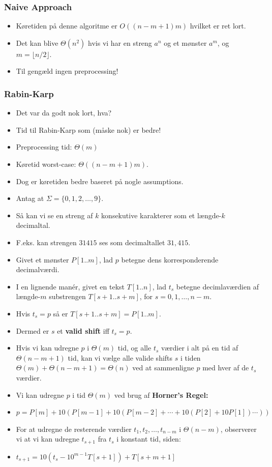 \documentclass{beamer}
\begin{document}
\begin{frame}[allowframebreaks]
  \frametitle{Naive Approach}
  \begin{itemize}
  \item Køretiden på denne algoritme er $O((n-m+1)m)$ hvilket er ret lort. 
  \item Det kan blive $\Theta (n^{2})$ hvis vi har en streng $a^{n}$ og et mønster $a^{m}$, og $m = \lfloor n / 2 \rfloor$. 
  \item Til gengæld ingen preprocessing!
  \end{itemize}
\end{frame}


\begin{frame}[allowframebreaks]
  \frametitle{Rabin-Karp}
  \begin{itemize}
  \item Det var da godt nok lort, hva? 
  \item Tid til Rabin-Karp som (måske nok) er bedre!
  \item Preprocessing tid: $\Theta (m)$
  \item Køretid worst-case: $\Theta ((n-m+1)m)$.
  \item Dog er køretiden bedre baseret på nogle assumptions. 
  \item Antag at $\Sigma = \{0, 1, 2, \ldots, 9\}$.
  \item Så kan vi se en streng af $k$ konsekutive karakterer som et længde-$k$ decimaltal.
  \item F.eks. kan strengen $31415$ ses som decimaltallet $31,415$. 
  \item Givet et mønster $P[1..m]$, lad $p$ betegne dens korresponderende decimalværdi. 
  \item I en lignende manér, givet en tekst $T[1..n]$, lad $t_{s}$ betegne decimlaværdien af længde-$m$ substrengen $T[s+1..s+m]$, for $s = 0, 1, \ldots, n -m$. 
  \item Hvis $t_{s} = p$ så er $T[s+1..s+m] = P[1..m]$.
  \item Dermed er $s$ et \textbf{valid shift} iff $t_{s} = p$. 
  \item Hvis vi kan udregne $p$ i $\Theta(m)$ tid, og alle $t_{s}$ værdier i alt på en tid af $\Theta (n-m+1)$ tid, kan vi vælge alle valide shifts $s$ i tiden $\Theta(m) + \Theta(n-m+1) = \Theta(n)$ ved at sammenligne $p$ med hver af de $t_{s}$ værdier. 
  \item Vi kan udregne $p$ i tid $\Theta(m)$ ved brug af \textbf{Horner's Regel:}
  \item $p = P[m] + 10 (P[m-1]+ 10 (P[m-2] + \cdots + 10(P[2] + 10P[1]) \cdots ) ) $
  \item For at udregne de resterende værdier $t_{1}, t_{2}, \ldots, t_{n-m}$ i $\Theta(n-m)$, observerer vi at vi kan udregne $t_{s+1}$ fra $t_{s}$ i konstant tid, siden: 
  \item $t_{s+1} = 10(t_{s}-10^{m-1}T[s+1]) + T[s+m+1]$
  \end{itemize}
  
\end{frame}
\end{document}
